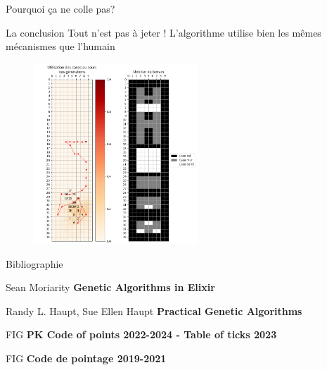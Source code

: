 \documentclass[aspectratio=43, usepdftitle=false, xcolor={dvipsnames}]{beamer}
\begin{document}
\begin{frame}{Pourquoi ça ne colle pas?}

\end{frame}

\begin{frame}{La conclusion}
	Tout n'est pas à jeter ! L'algorithme utilise bien les mêmes mécanismes que l'humain

	\begin{figure}
		\center
		\includegraphics[width=0.55\textwidth]{images/LILOUcases.png} 
	\end{figure}
\end{frame}

\begin{frame}{Bibliographie}
	\begin{enumerate}[label={[\arabic*]}, noitemsep]
		\item [1] Sean Moriarity \textbf{Genetic Algorithms in Elixir}
		\item [2] Randy L. Haupt, Sue Ellen Haupt \textbf{Practical Genetic Algorithms}
		\item [3] FIG \textbf{PK Code of points 2022-2024 - Table of ticks 2023}
		\item [4] FIG \textbf{Code de pointage 2019-2021}
	\end{enumerate}
\end{frame}
 
\end{document}

